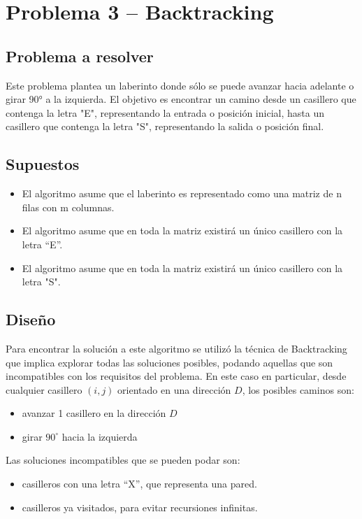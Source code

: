 
\section{Problema 3 – Backtracking}

\subsection{Problema a resolver}
Este problema plantea un laberinto donde sólo se puede avanzar hacia adelante o girar 90° a la izquierda. El objetivo es encontrar un camino desde un casillero que contenga la letra "E", representando la entrada o posición inicial, hasta un casillero que contenga la letra "S", representando la salida o posición final. 

\subsection{Supuestos}
\begin{itemize}
    \item El algoritmo asume que el laberinto es representado como una matriz de n filas con m columnas.
    \item El algoritmo asume que en toda la matriz existirá un único casillero con la letra ``E''.
    \item El algoritmo asume que en toda la matriz existirá un único casillero con la letra "S".
\end{itemize}

\subsection{Diseño}
Para encontrar la solución a este algoritmo se utilizó la técnica de Backtracking que implica explorar todas las soluciones posibles, podando aquellas que son incompatibles con los requisitos del problema.
En este caso en particular, desde cualquier casillero $(i, j)$ orientado en una dirección $D$, los posibles caminos son:
\begin{itemize}
    \item avanzar 1 casillero en la dirección $D$
    \item girar $90^\circ$ hacia la izquierda
\end{itemize}
Las soluciones incompatibles que se pueden podar son:
\begin{itemize}
    \item casilleros con una letra ``X'', que representa una pared.
    \item casilleros ya visitados, para evitar recursiones infinitas.
\end{itemize}

